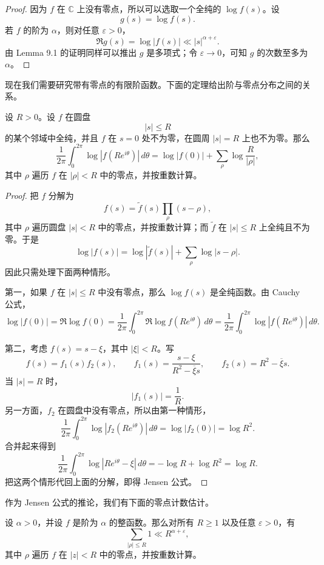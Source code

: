 \begin{proof}
	因为 $f$ 在 $\mathbb C$ 上没有零点，所以可以选取一个全纯的 $\log f(s)$。设
	\[
		g(s)=\log f(s).
	\]
	若 $f$ 的阶为 $\alpha$，则对任意 $\varepsilon>0$，
	\[
		\Re g(s)=\log |f(s)|\ll |s|^{\alpha+\varepsilon}.
	\]
	由 Lemma 9.1 的证明同样可以推出 $g$ 是多项式；令 $\varepsilon\to0$，可知 $g$ 的次数至多为 $\alpha$。
\end{proof}

现在我们需要研究带有零点的有限阶函数。下面的定理给出阶与零点分布之间的关系。

\begin{theorem}
	设 $R>0$。设 $f$ 在圆盘
	\[
		|s|\leq R
	\]
	的某个邻域中全纯，并且 $f$ 在 $s=0$ 处不为零，在圆周 $|s|=R$ 上也不为零。那么
	\[
		\frac{1}{2\pi}
		\int_0^{2\pi}\log |f(Re^{i\theta})|\,d\theta
		=
		\log |f(0)|
		+
		\sum_\rho \log\frac{R}{|\rho|},
	\]
	其中 $\rho$ 遍历 $f$ 在 $|\rho|<R$ 中的零点，并按重数计算。
\end{theorem}

\begin{proof}
	把 $f$ 分解为
	\[
		f(s)=\widetilde f(s)\prod_\rho (s-\rho),
	\]
	其中 $\rho$ 遍历圆盘 $|s|<R$ 中的零点，并按重数计算；而 $\widetilde f$ 在 $|s|\leq R$ 上全纯且不为零。于是
	\[
		\log |f(s)|
		=
		\log|\widetilde f(s)|
		+
		\sum_\rho \log|s-\rho|.
	\]
	因此只需处理下面两种情形。

	第一，如果 $f$ 在 $|s|\leq R$ 中没有零点，那么 $\log f(s)$ 是全纯函数。由 Cauchy 公式，
	\[
		\log |f(0)|
		=
		\Re \log f(0)
		=
		\frac{1}{2\pi}\int_0^{2\pi}
		\Re \log f(Re^{i\theta})\,d\theta
		=
		\frac{1}{2\pi}\int_0^{2\pi}
		\log |f(Re^{i\theta})|\,d\theta.
	\]

	第二，考虑 $f(s)=s-\xi$，其中 $|\xi|<R$。写
	\[
		f(s)=f_1(s)f_2(s),
		\qquad
		f_1(s)=\frac{s-\xi}{R^2-\overline{\xi}s},
		\qquad
		f_2(s)=R^2-\overline{\xi}s.
	\]
	当 $|s|=R$ 时，
	\[
		|f_1(s)|=\frac1R.
	\]
	另一方面，$f_2$ 在圆盘中没有零点，所以由第一种情形，
	\[
		\frac{1}{2\pi}\int_0^{2\pi}
		\log |f_2(Re^{i\theta})|\,d\theta
		=
		\log |f_2(0)|
		=
		\log R^2.
	\]
	合并起来得到
	\[
		\frac{1}{2\pi}\int_0^{2\pi}
		\log |Re^{i\theta}-\xi|\,d\theta
		=
		-\log R+\log R^2
		=
		\log R.
	\]
	把这两个情形代回上面的分解，即得 Jensen 公式。
\end{proof}

作为 Jensen 公式的推论，我们有下面的零点计数估计。

\begin{theorem}[原文 Theorem 9.4]
	设 $\alpha>0$，并设 $f$ 是阶为 $\alpha$ 的整函数。那么对所有 $R\geq1$ 以及任意 $\varepsilon>0$，有
	\[
		\sum_{|\rho|\leq R}1
		\ll
		R^{\alpha+\varepsilon},
	\]
	其中 $\rho$ 遍历 $f$ 在 $|z|<R$ 中的零点，并按重数计算。
\end{theorem}

